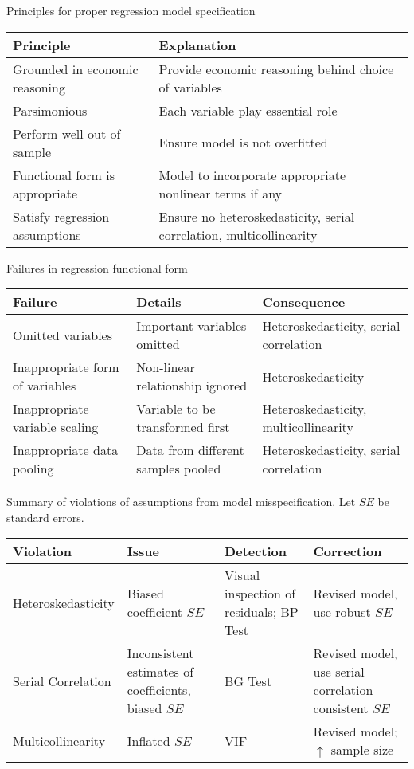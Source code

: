 \begin{flushleft}
Principles for proper regression model specification
\begin{tabularx}{\textwidth}{p{18em}|X}
\hline
\rowcolor{gray!30}
Principle & Explanation\\
\hline
Grounded in economic reasoning & Provide economic reasoning behind choice of variables\\
Parsimonious & Each variable play essential role\\
Perform well out of sample & Ensure model is not overfitted\\
Functional form is appropriate & Model to incorporate appropriate nonlinear terms if any\\
Satisfy regression assumptions & Ensure no heteroskedasticity, serial correlation, multicollinearity\\
\hline
\end{tabularx}
\end{flushleft}

\begin{flushleft}
Failures in regression functional form
\begin{tabularx}{\textwidth}{p{14em}|p{15em}|X}
\hline
\rowcolor{gray!30}
Failure & Details & Consequence \\
\hline
Omitted variables & Important variables omitted & Heteroskedasticity, serial correlation\\
Inappropriate form of variables & Non-linear relationship ignored & Heteroskedasticity\\
Inappropriate variable scaling & Variable to be transformed first & Heteroskedasticity, multicollinearity\\
Inappropriate data pooling & Data from different samples pooled & Heteroskedasticity, serial correlation\\
\hline
\end{tabularx}
\end{flushleft}

\newpage

\begin{flushleft}
Summary of violations of assumptions from model misspecification. Let $SE$ be standard errors.
\begin{tabularx}{\textwidth}{p{8em}|X|p{10em}|X}
\hline
\rowcolor{gray!30}
Violation & Issue & Detection & Correction \\
\hline
Heteroskedasticity & Biased coefficient $SE$ & Visual inspection of residuals; BP Test & Revised model, use robust $SE$\\
\hline
Serial Correlation & Inconsistent estimates of coefficients, biased $SE$ & BG Test & Revised model, use serial correlation consistent $SE$\\
\hline
Multicollinearity & Inflated $SE$ & VIF & Revised model; $\uparrow$ sample size \\
\hline
\end{tabularx}
\end{flushleft}


